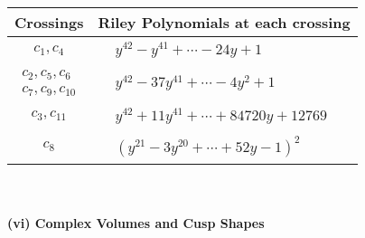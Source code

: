 \documentclass[1p]{elsarticle_modified}
\theoremstyle{definition}
\begin{document}
\begin{tabular}{m{50pt}|m{274pt}}
Crossings & \hspace{64pt}Riley Polynomials at each crossing \\
\hline $$\begin{aligned}c_{1},c_{4}\end{aligned}$$&$\begin{aligned}
&y^{42}- y^{41}+\cdots-24 y+1
\end{aligned}$\\
\hline $$\begin{aligned}c_{2},c_{5},c_{6}\\c_{7},c_{9},c_{10}\end{aligned}$$&$\begin{aligned}
&y^{42}-37 y^{41}+\cdots-4 y^2+1
\end{aligned}$\\
\hline $$\begin{aligned}c_{3},c_{11}\end{aligned}$$&$\begin{aligned}
&y^{42}+11 y^{41}+\cdots+84720 y+12769
\end{aligned}$\\
\hline $$\begin{aligned}c_{8}\end{aligned}$$&$\begin{aligned}
&(y^{21}-3 y^{20}+\cdots+52 y-1)^{2}
\end{aligned}$\\
\hline
\end{tabular}\\~\\
\newpage\flushleft \textbf{(vi) Complex Volumes and Cusp Shapes}
\end{document}
